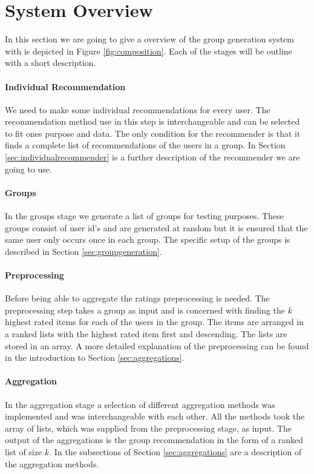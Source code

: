 \section{System Overview}\label{sec:systemoverview}
In this section we are going to give a overview of the group generation system with is depicted in Figure \ref{fig:composition}. Each of the stages will be outline with a short description. 

\paragraph{Individual Recommendation} We need to make some individual recommendations for every user. The recommendation method use in this step is interchangeable and can be selected to fit ones purpose and data. The only condition for the recommender is that it finds a complete list of recommendations of the users in a group. In Section \ref{sec:individualrecommender} is a further description of the recommender we are going to use.

\paragraph{Groups} In the groups stage we generate a list of groups for testing purposes. These groups consist of user id's and are generated at random but it is ensured that the same user only occurs once in each group. The specific setup of the groups is described in Section \ref{sec:groupgeneration}.

\paragraph{Preprocessing} Before being able to aggregate the ratings preprocessing is needed. The preprocessing step takes a group as input and is concerned with finding the $k$ highest rated items for each of the users in the group. The items are arranged in a ranked lists with the highest rated item first and descending. The lists are stored in an array. A more detailed explanation of the preprocessing can be found in the introduction to Section \ref{sec:aggregations}.

\paragraph{Aggregation} In the aggregation stage a selection of different aggregation methods was implemented and was interchangeable with each other. All the methods took the array of lists, which was supplied from the preprocessing stage, as input. The output of the aggregations is the group recommendation in the form of a ranked list of size $k$. In the subsections of Section \ref{sec:aggregations} are a description of the aggregation methods. 

